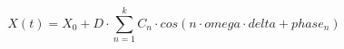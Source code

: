 \documentclass[12pt]{article}
\begin{document}
$$
   X(t) = X_0 + D \cdot \sum_{n = 1}^{k} C_{n} \cdot cos(n \cdot omega \cdot delta+ phase_n)  
$$
\end{document}
